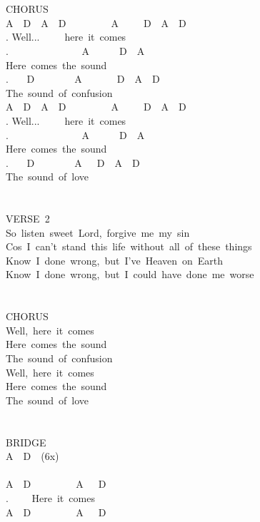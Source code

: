 {\\
\\
CHORUS\\
A\ \ D\ \ A\ \ D\ \ \ \ \ \ \ \ \ A\ \ \ \ \ D\ \ A\ \ D\\
. Well...\ \ \ \ \ here\ it\ comes\\
. \ \ \ \ \ \ \ \ \ \ \ \ \ \ A\ \ \ \ \ \ D\ \ A\\
Here\ comes\ the\ sound\\
. \ \ \ D\ \ \ \ \ \ \ \ A\ \ \ \ \ \ \ D\ \ A\ \ D\\
The\ sound\ of\ confusion\\
A\ \ D\ \ A\ \ D\ \ \ \ \ \ \ \ \ A\ \ \ \ \ D\ \ A\ \ D\\
. Well...\ \ \ \ \ here\ it\ comes\\
. \ \ \ \ \ \ \ \ \ \ \ \ \ \ A\ \ \ \ \ \ D\ \ A\\
Here\ comes\ the\ sound\\
. \ \ \ D\ \ \ \ \ \ \ \ A\ \ \ D\ \ A\ \ D\\
The\ sound\ of\ love\\
\\
\\
VERSE\ 2\\
So\ listen\ sweet\ Lord,\ forgive\ me\ my\ sin\\
Cos\ I\ can't\ stand\ this\ life\ without\ all\ of\ these\ things\\
Know\ I\ done\ wrong,\ but\ I've\ Heaven\ on\ Earth\\
Know\ I\ done\ wrong,\ but\ I\ could\ have\ done\ me\ worse\\
\\
\\
CHORUS\\
Well,\ here\ it\ comes\\
Here\ comes\ the\ sound\\
The\ sound\ of\ confusion\\
Well,\ here\ it\ comes\\
Here\ comes\ the\ sound\\
The\ sound\ of\ love\\
\\
\\
BRIDGE\\
A\ \ D\ \ (6x)\\
\\
A\ \ D\ \ \ \ \ \ \ \ \ A\ \ \ D\ \ \\
. \ \ \ \ Here\ it\ comes\\
A\ \ D\ \ \ \ \ \ \ \ \ A\ \ \ D\ \ \\
}
